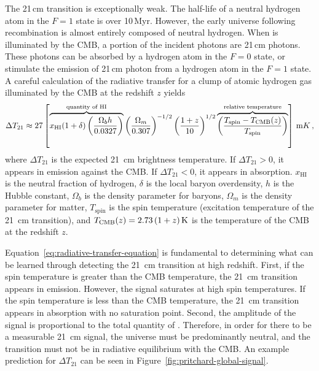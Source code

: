 \begin{bibunit}
The 21\,cm transition is exceptionally weak.  The half-life of a neutral hydrogen atom in the $F=1$
state is over 10\,Myr.  However, the early universe following recombination is almost entirely
composed of neutral hydrogen. When  is illuminated by the CMB, a portion of the incident
photons are 21\,cm photons. These photons can be absorbed by a hydrogen atom in the $F=0$ state, or
stimulate the emission of 21\,cm photon from a hydrogen atom in the $F=1$ state.  A careful
calculation of the radiative transfer for a clump of atomic hydrogen gas illuminated by the CMB at
the redshift $z$ yields \citep[neglecting the contribution of peculiar
velocities;][]{2012RPPh...75h6901P}
\begin{equation}\label{eq:radiative-transfer-equation}
    \Delta T_{21} \approx 27 \left[
        \overbrace{
            x_\text{HI} (1+\delta)
            \left(\frac{\Omega_b h}{0.0327}\right)
        }^{\text{quantity of HI}}
        \left(\frac{\Omega_m}{0.307}\right)^{-1/2}
        \left(\frac{1+z}{10}\right)^{1/2}
        \overbrace{
            \left(\frac{T_\text{spin} - T_\text{CMB}(z)}{T_\text{spin}}\right)
        }^{\text{relative temperature}}
    \right] \, {\rm mK} \,,
\end{equation}
where $\Delta T_{21}$ is the expected 21~cm brightness temperature. If $\Delta T_{21} > 0$, it
appears in emission against the CMB. If $\Delta T_{21} < 0$, it appears in absorption. $x_\text{HI}$
is the neutral fraction of hydrogen, $\delta$ is the local baryon overdensity, $h$ is the Hubble
constant, $\Omega_b$ is the density parameter for baryons, $\Omega_m$ is the density parameter for
matter, $T_\text{spin}$ is the spin temperature (excitation temperature of the 21~cm transition),
and $T_\text{CMB}(z) = 2.73\,(1+z)\,{\rm K}$ is the temperature of the CMB at the redshift $z$.

Equation~\ref{eq:radiative-transfer-equation} is fundamental to determining what can be learned
through detecting the 21~cm transition at high redshift. First, if the spin temperature is greater
than the CMB temperature, the 21~cm transition appears in emission. However, the signal saturates at
high spin temperatures. If the spin temperature is less than the CMB temperature, the 21~cm
transition appears in absorption with no saturation point. Second, the amplitude of the signal is
proportional to the total quantity of . Therefore, in order for there to be a measurable
21~cm signal, the universe must be predominantly neutral, and the transition must not be in
radiative equilibrium with the CMB. An example prediction for $\Delta T_{21}$ can be seen in
Figure~\ref{fig:pritchard-global-signal}.


\end{bibunit}
